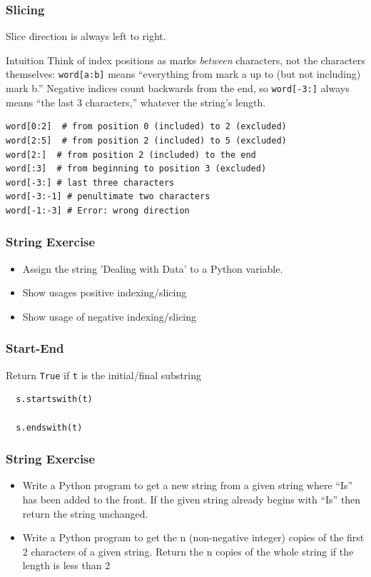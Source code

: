 \begin{frame}[fragile]\frametitle{Slicing}
Slice direction is always left to right.
\begin{block}{Intuition}
Think of index positions as marks \emph{between} characters, not the characters themselves: \texttt{word[a:b]} means ``everything from mark a up to (but not including) mark b.'' Negative indices count backwards from the end, so \texttt{word[-3:]} always means ``the last 3 characters,'' whatever the string's length.
\end{block}
\begin{lstlisting}
word[0:2]  # from position 0 (included) to 2 (excluded)
word[2:5]  # from position 2 (included) to 5 (excluded)
word[2:]  # from position 2 (included) to the end
word[:3]  # from beginning to position 3 (excluded)
word[-3:] # last three characters
word[-3:-1] # penultimate two characters
word[-1:-3] # Error: wrong direction
\end{lstlisting}
\end{frame}

\begin{frame}[fragile]\frametitle{String Exercise}
  \begin{itemize}
  \item Assign the string 'Dealing with Data' to a Python variable.
  \item  Show usages positive indexing/slicing
  \item  Show usage of negative indexing/slicing
  \end{itemize}
\end{frame}



\begin{frame}[fragile]\frametitle{Start-End}
    Return \texttt{True} if \texttt{t} is the initial/final substring
  \begin{lstlisting}
  s.startswith(t)

  s.endswith(t)
  \end{lstlisting}
\end{frame}

\begin{frame}[fragile]\frametitle{String Exercise}
  \begin{itemize}
  \item Write a Python program to get a new string from a given string where ``Is'' has been added to the front. If the given string already begins with ``Is'' then return the string unchanged.
  \item  Write a Python program to get the n (non-negative integer) copies of the first 2 characters of a given string. Return the n copies of the whole string if the length is less than 2
  \end{itemize}
\end{frame}

